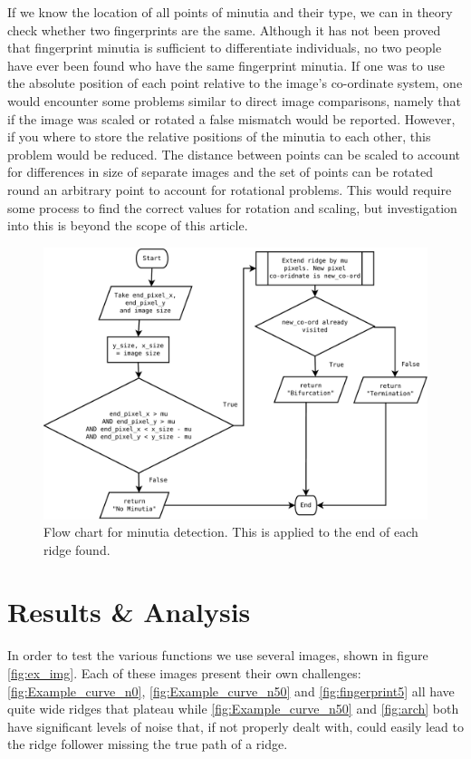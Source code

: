 \documentclass[11pt,a4paper]{article}
\begin{document}
\begin{multicols}{2}
        If we know the location of all points of minutia and their type, we can in theory check whether two fingerprints are the same. Although it has not been proved that fingerprint minutia is sufficient to differentiate individuals, no two people have ever been found who have the same fingerprint minutia. If one was to use the absolute position of each point relative to the image's co-ordinate system, one would encounter some problems similar to direct image comparisons, namely that if the image was scaled or rotated a false mismatch would be reported. However, if you where to store the relative positions of the minutia to each other, this problem would be reduced. The distance between points can be scaled to account for differences in size of separate images and the set of points can be rotated round an arbitrary point to account for rotational problems. This would require some process to find the correct values for rotation and scaling, but investigation into this is beyond the scope of this article.
        \begin{figure}
          \centering
          \includegraphics[width = \textwidth]{minutia}
          \caption{Flow chart for minutia detection. This is applied to the end of each ridge found.}
          \label{fig:min-alg}
        \end{figure}

\section{Results \& Analysis}
	In order to test the various functions we use several images, shown in figure \ref{fig:ex_img}. Each of these images present their own challenges: \ref{fig:Example_curve_n0}, \ref{fig:Example_curve_n50} and \ref{fig:fingerprint5} all have quite wide ridges that plateau while \ref{fig:Example_curve_n50} and \ref{fig:arch} both have significant levels of noise that, if not properly dealt with, could easily lead to the ridge follower missing the true path of a ridge.


\end{multicols}
\end{document}

